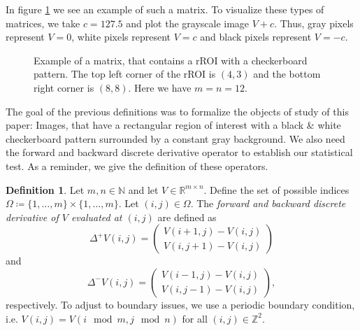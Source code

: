 \documentclass[a4paper,12pt]{article}
\theoremstyle{plain}
\theoremstyle{definition}
\newtheorem{definition}[theorem]{Definition}
\begin{document}
In figure \ref{fig: rROI} we see an example of such a matrix. To visualize these types of matrices, we take $c = 127.5$ and plot the grayscale image $V + c$. Thus, gray pixels represent $V = 0$, white pixels represent $V = c$ and black pixels represent $V = - c$.

\begin{figure}[h]
	\centering
	\caption{Example of a matrix, that contains a rROI with a checkerboard pattern. The top left corner of the rROI is $(4, 3)$ and the bottom right corner is $(8, 8)$. Here we have $m = n = 12$.}
	\label{fig: rROI}
\end{figure}

The goal of the previous definitions was to formalize the objects of study of this paper: Images, that have a rectangular region of interest with a black \& white checkerboard pattern surrounded by a constant gray background. We also need the forward and backward discrete derivative operator to establish our statistical test. As a reminder, we give the definition of these operators.

\begin{definition}
	Let $m, n \in \mathbb{N}$ and let $V \in \mathbb{R}^{m \times n}$. Define the set of possible indices $\Omega \coloneqq \{ 1, \dots, m \} \times \{ 1, \dots, m \}$. Let $(i, j) \in \Omega$. The \textit{forward and backward discrete derivative of $V$ evaluated at $(i, j)$} are defined as
	\begin{equation}
		\Delta^+ V(i, j) =
		\begin{pmatrix}
			V(i + 1, j) - V(i, j) \\
			V(i, j + 1) - V(i, j)
		\end{pmatrix}
	\end{equation}
	and
	\begin{equation}
		\Delta^- V(i, j) =
		\begin{pmatrix}
			V(i - 1, j) - V(i, j) \\
			V(i, j - 1) - V(i, j)
		\end{pmatrix}
		,
	\end{equation}
	respectively. To adjust to boundary issues, we use a periodic boundary condition, i.e. $V(i, j) = V(i \mod m, j \mod n)$ for all $(i, j) \in \mathbb{Z}^2$.
\end{definition}
\end{document}
